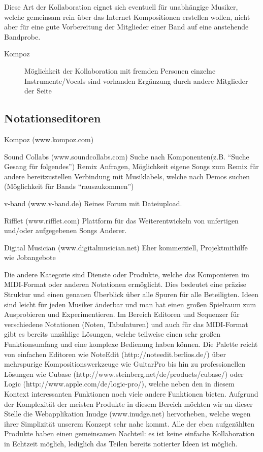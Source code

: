 \documentclass[12pt]{scrartcl}
\begin{document}
Diese Art der Kollaboration eignet sich eventuell für unabhängige Musiker, welche gemeinsam rein über das Internet Kompositionen erstellen wollen, nicht aber für eine gute Vorbereitung der Mitglieder einer Band auf eine anstehende Bandprobe.

\begin{description}
\item[Kompoz]
Möglichkeit der Kollaboration mit fremden Personen
einzelne Instrumente/Vocals sind vorhanden
Ergänzung durch andere Mitglieder der Seite 

\end{description}


\subsection{Notationseditoren}






Kompoz (www.kompoz.com)


Sound Collabs (www.soundcollabs.com)
Suche nach Komponenten(z.B. “Suche Gesang für folgendes”)
Remix Anfragen, Möglichkeit eigene Songs zum Remix für andere bereitzustellen
Verbindung mit Musiklabels, welche nach Demos suchen (Möglichkeit für Bands “rauszukommen”)

v-band (www.v-band.de)
Reines Forum mit Dateiupload.

Rifflet (www.rifflet.com)
Plattform für das Weiterentwickeln von unfertigen und/oder aufgegebenen Songs Anderer.


Digital Musician (www.digitalmusician.net)
Eher kommerziell, Projektmithilfe wie Jobangebote


Die andere Kategorie sind Dienste oder Produkte, welche das Komponieren im MIDI-Format oder anderen Notationen ermöglicht. Dies bedeutet eine präzise Struktur und einen genauen Überblick über alle Spuren für alle Beteiligten. Ideen sind leicht für jeden Musiker änderbar und man hat einen großen Spielraum zum Ausprobieren und Experimentieren.
Im Bereich Editoren und Sequenzer für verschiedene Notationen (Noten, Tabulaturen) und auch für das MIDI-Format gibt es bereits unzählige Lösungen, welche teilweise einen sehr großen Funktionsumfang und eine komplexe Bedienung haben können. Die Palette reicht von einfachen Editoren wie NoteEdit (http://noteedit.berlios.de/) über mehrspurige Kompositionswerkzeuge wie GuitarPro bis hin zu professionellen Lösungen wie Cubase (http://www.steinberg.net/de/products/cubase/) oder Logic (http://www.apple.com/de/logic-pro/), welche neben den in diesem Kontext interessanten Funktionen noch viele andere Funktionen bieten. Aufgrund der Komplexität der meisten Produkte in diesem Bereich möchten wir an dieser Stelle die Webapplikation Inudge (www.inudge.net) hervorheben, welche wegen ihrer Simplizität unserem Konzept sehr nahe kommt.
Alle der eben aufgezählten Produkte haben einen gemeinsamen Nachteil: es ist keine einfache Kollaboration in Echtzeit möglich, lediglich das Teilen bereits notierter Ideen ist möglich.
\end{document}
